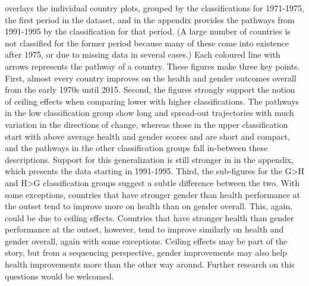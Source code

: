 \documentclass[12pt]{article}
\begin{document}
 overlays the individual country plots, grouped by the classifications for 1971-1975, the first period in the dataset, and  in the appendix provides the pathways from 1991-1995 by the classification for that period.
(A large number of countries is not classified for the former period because many of these come into existence after 1975, or due to missing data in several cases.)
Each coloured line with arrows represents the pathway of a country.
These figures make three key points.
First, almost every country improves on the health and gender outcomes overall from the early 1970s until 2015.
Second, the figures strongly support the notion of ceiling effects when comparing lower with higher classifications.
The pathways in the low classification group show long and spread-out trajectories with much variation in the directions of change, whereas those in the upper classification start with above average health and gender scores and are short and compact, and the pathways in the other classification groups fall in-between these descriptions.
Support for this generalization is still stronger in  in the appendix, which presents the data starting in 1991-1995.
Third, the sub-figures for the G>H and H>G classification groups suggest a subtle difference between the two.
With some exceptions, countries that have stronger  gender than health performance at the outset tend to improve more on health than on gender overall.
This, again, could be due to ceiling effects.
Countries that have stronger health than gender performance at the outset, however, tend to improve similarly on health and gender overall, again with some exceptions.
Ceiling effects may be part of the story, but from a sequencing perspective, gender improvements may also help health improvements more than the other way around.
Further research on this questions would be welcomed.
\end{document}
